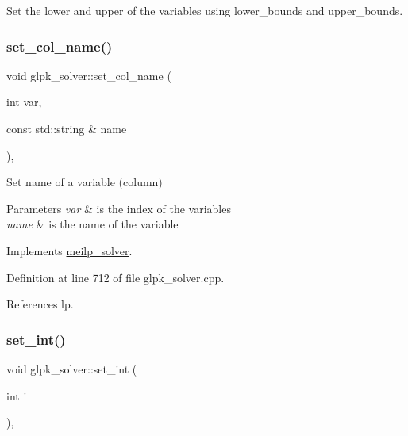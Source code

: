 Set the lower and upper of the variables using lower\+\_\+bounds and upper\+\_\+bounds. 

\mbox{\label{classglpk__solver_aaed1f108a4909b6697fe7a5483bb259a}} 
\subsubsection{\texorpdfstring{set\+\_\+col\+\_\+name()}{set\_col\_name()}}
{\footnotesize\ttfamily void glpk\+\_\+solver\+::set\+\_\+col\+\_\+name (\begin{DoxyParamCaption}\item[{int}]{var,  }\item[{const std\+::string \&}]{name }\end{DoxyParamCaption})\hspace{0.3cm}{\ttfamily [override]}, {\ttfamily [virtual]}}



Set name of a variable (column) 


\begin{DoxyParams}{Parameters}
{\em var} & is the index of the variables \\
\hline
{\em name} & is the name of the variable \\
\hline
\end{DoxyParams}


Implements \hyperlink{classmeilp__solver_a25c13b43b35a744bb0243fe6f8192244}{meilp\+\_\+solver}.



Definition at line 712 of file glpk\+\_\+solver.\+cpp.



References lp.

\mbox{\label{classglpk__solver_a036f03d3c3fb34341846be7f077b565d}} 
\subsubsection{\texorpdfstring{set\+\_\+int()}{set\_int()}}
{\footnotesize\ttfamily void glpk\+\_\+solver\+::set\+\_\+int (\begin{DoxyParamCaption}\item[{int}]{i }\end{DoxyParamCaption})\hspace{0.3cm}{\ttfamily [override]}, {\ttfamily [virtual]}}



